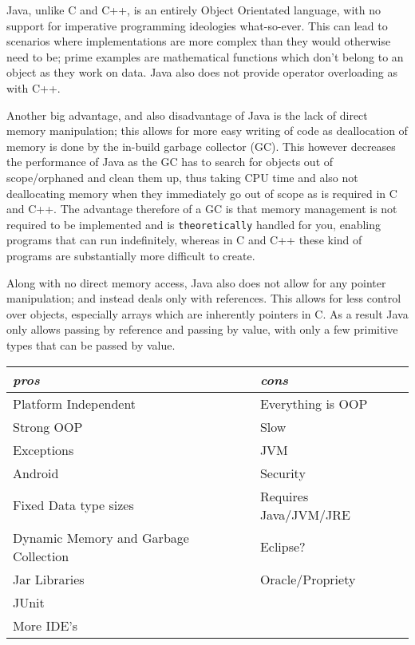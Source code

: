 \documentclass[10pt]{article}
\begin{document}
    Java, unlike C and C++, is an entirely Object Orientated language, with no support for imperative programming ideologies what-so-ever. This can lead to scenarios where implementations are more complex than they would otherwise need to be; prime examples are mathematical functions which don't belong to an object as they work on data. Java also does not provide operator overloading as with C++.

    Another big advantage, and also disadvantage of Java is the lack of direct memory manipulation; this allows for more easy writing of code as deallocation of memory is done by the in-build garbage collector (GC). This however decreases the performance of Java as the GC has to search for objects out of scope/orphaned and clean them up, thus taking CPU time and also not deallocating memory when they immediately go out of scope as is required in C and C++. The advantage therefore of a GC is that memory management is not required to be implemented and is \texttt{theoretically} handled for you, enabling programs that can run indefinitely, whereas in C and C++ these kind of programs are substantially more difficult to create. 

    Along with no direct memory access, Java also does not allow for any pointer manipulation; and instead deals only with references. This allows for less control over objects, especially arrays which are inherently pointers in C. As a result Java only allows passing by reference and passing by value, with only a few primitive types that can be passed by value.

    \begin{tabular}{| p{7cm} | p{7cm} |}
      \hline
      \emph{pros} & \emph{cons} \\ \hline \hline

      Platform Independent & Everything is OOP \\ \hline
      Strong OOP & Slow \\ \hline
      Exceptions & JVM \\ \hline
      Android & Security \\ \hline
      Fixed Data type sizes & Requires Java/JVM/JRE \\ \hline
      Dynamic Memory and Garbage Collection & Eclipse? \\ \hline
      Jar Libraries & Oracle/Propriety \\ \hline
      JUnit & \\ \hline
      More IDE's & \\ \hline
      
    \end{tabular}
\end{document}
